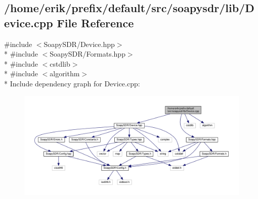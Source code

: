 \subsection{/home/erik/prefix/default/src/soapysdr/lib/\+Device.cpp File Reference}
\label{Device_8cpp}
{\ttfamily \#include $<$Soapy\+S\+D\+R/\+Device.\+hpp$>$}\\*
{\ttfamily \#include $<$Soapy\+S\+D\+R/\+Formats.\+hpp$>$}\\*
{\ttfamily \#include $<$cstdlib$>$}\\*
{\ttfamily \#include $<$algorithm$>$}\\*
Include dependency graph for Device.\+cpp\+:
\nopagebreak
\begin{figure}[H]
\begin{center}
\leavevmode
\includegraphics[width=350pt]{d5/de1/Device_8cpp__incl}
\end{center}
\end{figure}
